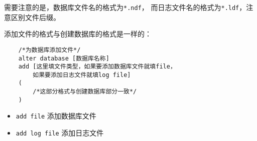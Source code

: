 \qquad 需要注意的是，数据库文件名的格式为\texttt{*.ndf}，
而日志文件名的格式为\texttt{*.ldf}，注意区别文件后缀。

\qquad 添加文件的格式与创建数据库的格式是一样的：

\begin{mdframed}[backgroundcolor=gray!10]
\begin{verbatim}
    /*为数据库添加文件*/
    alter database [数据库名称]
    add [这里填文件类型，如果要添加数据库文件就填file，
        如果要添加日志文件就填log file]
    (
        /*这部分格式与创建数据库部分一致*/
    )
\end{verbatim}
\end{mdframed}

\begin{itemize}
  \item \texttt{add file} 添加数据库文件
  \item \texttt{add log file} 添加日志文件
\end{itemize}